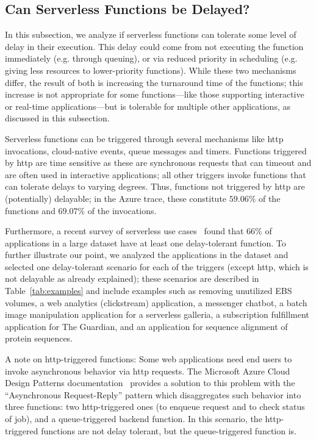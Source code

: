 \subsection{Can Serverless Functions be Delayed?}
\label{sec:motivation:delay-tolerant}
In this subsection, we analyze if serverless functions can tolerate some level of delay in their execution. 
This delay could come from not executing the function immediately (e.g. through queuing), or via reduced priority in scheduling (e.g. giving less resources to lower-priority functions).
While these two mechanisms differ, the result of both is increasing the turnaround time of the functions; this increase is not appropriate for some functions---like those supporting interactive or real-time applications---but is tolerable for multiple other applications, as discussed in this subsection.

Serverless functions can be triggered through several mechanisms like http invocations, cloud-native events, queue messages and timers.
Functions triggered by http are time sensitive as these are synchronous requests that can timeout and are often used in interactive applications;
all other triggers invoke functions that can tolerate delays to varying degrees.
Thus, functions not triggered by http are (potentially) delayable; in the Azure trace, these constitute $59.06\%$ of the functions and $69.07\%$ of the invocations.

Furthermore, a recent survey of serverless use cases~\cite{Eismann:TSE:2021:CommunityConsensus} found that 66\% of applications in a large dataset have at least one delay-tolerant function.
To further illustrate our point, we analyzed the applications in the dataset and selected one delay-tolerant scenario for each of the triggers (except http, which is not delayable as already explained);
these scenarios are described in Table~\ref{tab:examples} and include examples such as removing unutilized EBS volumes, a web analytics (clickstream) application, a messenger chatbot, a batch image manipulation application for a serverless galleria, a subscription fulfillment application for The Guardian, and an application for sequence alignment of protein sequences.

A note on http-triggered functions: Some web applications need end users to invoke asynchronous behavior via http requests.
The Microsoft Azure Cloud Design Patterns documentation~\cite{Eastbury:2022:Azure:AsyncPattern} provides a solution to this problem with the ``Asynchronous Request-Reply'' pattern which disaggregates such behavior into three functions: two http-triggered ones (to enqueue request and to check status of job), and a queue-triggered backend function.
In this scenario, the http-triggered functions are not delay tolerant, but the queue-triggered function is.


